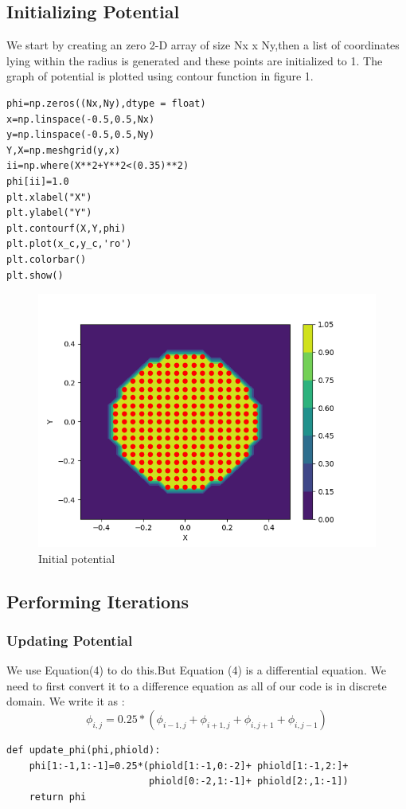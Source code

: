 \documentclass{article}
\begin{document}
\subsection*{Initializing Potential }
We start by creating an zero 2-D array of size Nx x Ny,then a list of coordinates lying within the radius is generated and these points are initialized to 1. The graph of potential is plotted using contour function in figure 1.
\begin{lstlisting}
phi=np.zeros((Nx,Ny),dtype = float)
x=np.linspace(-0.5,0.5,Nx)
y=np.linspace(-0.5,0.5,Ny)
Y,X=np.meshgrid(y,x)
ii=np.where(X**2+Y**2<(0.35)**2)
phi[ii]=1.0
plt.xlabel("X")
plt.ylabel("Y")
plt.contourf(X,Y,phi)
plt.plot(x_c,y_c,'ro')
plt.colorbar()
plt.show()
\end{lstlisting}

\begin{figure}[h!]
\centering
\includegraphics[scale=0.7]{Figure_1_5.png}
\caption{Initial potential}
\label{Initial potential}
\end{figure}



\subsection*{Performing Iterations}
\subsubsection*{Updating Potential}
We use Equation(4) to do this.But Equation (4) is a differential equation. We need to first convert it to a difference equation as all of our code is in discrete domain.
We write it as :
\begin{equation}
    \phi_{i,j} = 0.25*(\phi_{i-1,j} + \phi_{i+1,j} + \phi_{i,j+1} + \phi_{i,j-1})
\end{equation}
\begin{lstlisting}
def update_phi(phi,phiold):
    phi[1:-1,1:-1]=0.25*(phiold[1:-1,0:-2]+ phiold[1:-1,2:]+ 
                         phiold[0:-2,1:-1]+ phiold[2:,1:-1])
    return phi
\end{lstlisting}
\end{document}
